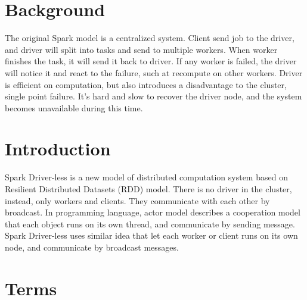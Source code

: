 
\section{Background} %
\label{sec:background}

The original Spark model is a centralized system.
Client send job to the driver, and driver will split into tasks and send to multiple workers.
When worker finishes the task, it will send it back to driver.
If any worker is failed, the driver will notice it and react to the failure, such at recompute on other workers.
Driver is efficient on computation, but also introduces a disadvantage to the cluster, single point failure.
It's hard and slow to recover the driver node, and the system becomes unavailable during this time.



\section{Introduction} %
\label{sec:introduction}

Spark Driver-less is a new model of distributed computation system based on Resilient Distributed Datasets (RDD)\cite{rdd} model.
There is no driver in the cluster, instead, only workers and clients.
They communicate with each other by broadcast.
In programming language, actor model describes a cooperation model that each object runs on its own thread,
and communicate by sending message.
Spark Driver-less uses similar idea that let each worker or client runs on its own node,
and communicate by broadcast messages.



\section{Terms} %
\label{sec:terms}



